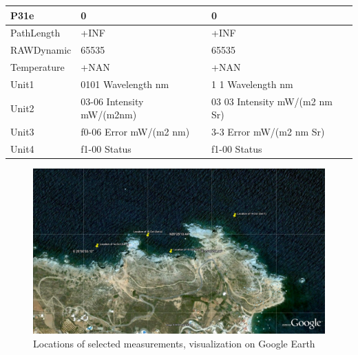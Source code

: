 \documentclass[10pt, a4paper]{article}
\begin{document}
\begin{appendices}
\begin{table}[H]
\begin{tabular}{| p{3cm} | p{3cm} | p{5cm} |}
		   P31e & 0 & 0 \\ \hline
		   PathLength & +INF & +INF \\ \hline
		   RAWDynamic & 65535 & 65535 \\ \hline
		   Temperature & +NAN & +NAN \\ \hline
		   Unit1 & 0101 Wavelength nm &  1 1 Wavelength nm \\ \hline
		   Unit2 & 03-06 Intensity mW/(m2nm) & 03 03 Intensity mW/(m2 nm Sr) \\ \hline
		   Unit3 & f0-06 Error mW/(m2 nm) & 3-3 Error mW/(m2 nm Sr) \\ \hline
		  Unit4 & f1-00 Status & f1-00 Status \\ \hline
	  \end{tabular}
	\label{tab:32}
\end{table}
\pagebreak

\begin{figure}[H]
	\begin{center}
		\includegraphics[scale=0.20]{Locations_Meas.jpg}
		\caption{Locations of selected measurements, visualization on Google Earth­}
	\end{center}
	\label{fig:67}
\end{figure}


\end{appendices}
\end{document}
